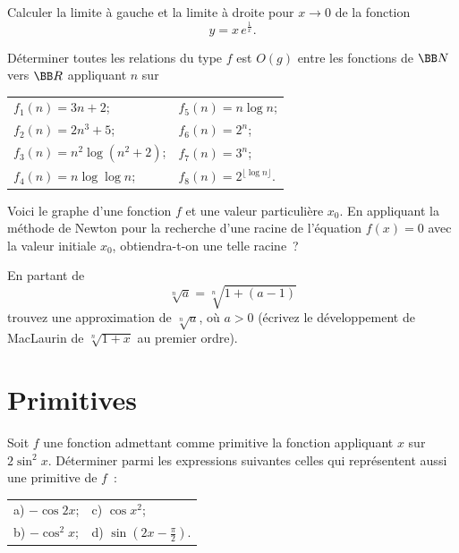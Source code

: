 \documentclass[12pt,french,oneside,a4paper]{memoir} %
\begin{document}
 \begin{exo}
Calculer la limite à gauche et la limite à droite pour
   $x\to 0$ de la fonction 
   \begin{equation*}
   \displaystyle{y=x\,e^{\frac{1}{x}}}.
\end{equation*}
\end{exo}
\begin{exo}
Déterminer toutes les relations du type \og $f$ est $O(g)$\fg{}
   entre les fonctions de ${\BB N}$ vers ${\BB R}$ appliquant $n$ sur
   
   \begin{tabular}{ll}
   $f_1(n)=3n+2$;\qquad\qquad&$f_5(n)=n\log n$;\\
   $f_2(n)=2n^3+5$;\qquad\qquad&$f_6(n)=2^n$;\\
   $f_3(n)=n^2\log(n^2+2)$;\qquad\qquad&$f_7(n)=3^n$;\\
   $f_4(n)=n\log\log n$;\qquad\qquad&$f_8(n)=2^{\lfloor\log
   n\rfloor}$.
   \end{tabular}
   
 \end{exo}
 \begin{exo}
   Voici le graphe d'une fonction $f$ et une valeur
  particulière $x_0$. En appliquant la méthode de Newton pour la
  recherche d'une racine de l'équation $f(x)=0$ avec la valeur
  initiale $x_0$, obtiendra-t-on une telle racine~?
\end{exo}
\begin{exo}
  
En partant de 
  $$
  \sqrt[n] a=\sqrt[n]{1+(a-1)}
  $$
  trouvez une approximation de $\sqrt[n] a$, où $a>0$ (écrivez le
  développement de MacLaurin de $\sqrt[n]{1+x}$ au premier ordre).
\end{exo}
\chapter{Primitives}

%

\begin{exo}
Soit $f$ une fonction admettant comme primitive la fonction
appliquant $x$ sur $2\sin^2x$. Déterminer parmi les expressions
suivantes celles qui représentent aussi une primitive de
$f$~:
\begin{center}
\begin{tabular}{ll}
a) $ -\cos 2x$;\qquad\qquad&\qquad\qquad c) $\cos x^2$;\\
b) $ -\cos^2x$;\qquad\qquad&\qquad\qquad d)
$\sin\left(2x-\displaystyle{\frac{\pi}{2}}\right)$.
 \end{tabular}
\end{center}
\end{exo}
\end{document}
